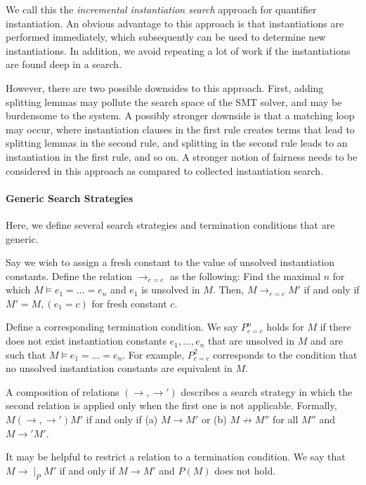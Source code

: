 \documentclass{llncs}
\begin{document}
We call this the \emph{incremental instantiation search} approach for quantifier instantiation.
An obvious advantage to this approach is that instantiations are performed immediately, which subsequently can be used to determine new instantiations.
In addition, we avoid repeating a lot of work if the instantiations are found deep in a search.

However, there are two possible downsides to this approach.
First, adding splitting lemmas may pollute the search space of the SMT solver, and may be burdensome to the system.
A possibly stronger downside is that a matching loop may occur, where instantiation clauses in the first rule creates terms that lead to splitting lemmas in the second rule, and splitting in the second rule leads to an instantiation in the first rule, and so on.
A stronger notion of fairness needs to be considered in this approach as compared to collected instantiation search.

\paragraph{Generic Search Strategies}

Here, we define several search strategies and termination conditions that are generic.

Say we wish to assign a fresh constant to the value of unsolved instantiation constants.
Define the relation $\rightarrow_{e=c}$ as the following: 
Find the maximal $n$ for which $M \models e_1 = \ldots = e_n$ and $e_1$ is unsolved in $M$.  
Then, $M \rightarrow_{e=c} M'$ if and only if $M' = M, (e_1 = c)$ for fresh constant $c$.

Define a corresponding termination condition.
We say $P^n_{e=c}$ holds for $M$ if there does not exist instantiation constants $e_1, \ldots, e_n$ that are unsolved in $M$ and are such that $M \models e_1 = \ldots = e_n$.  
For example, $P^2_{e=c}$ corresponds to the condition that no unsolved instantiation constants are equivalent in $M$.

A composition of relations $(\rightarrow, \rightarrow')$ describes a search strategy in which the second relation is applied only when the first one is not applicable.
Formally, $M (\rightarrow, \rightarrow') M'$ if and only if (a) $M \rightarrow M'$ or (b) $M \not\rightarrow M''$ for all $M''$ and $M \rightarrow' M'$.

It may be helpful to restrict a relation to a termination condition.
We say that $M \rightarrow \mid_P M'$ if and only if $M \rightarrow M'$ and $P( M )$ does not hold.
\end{document}

